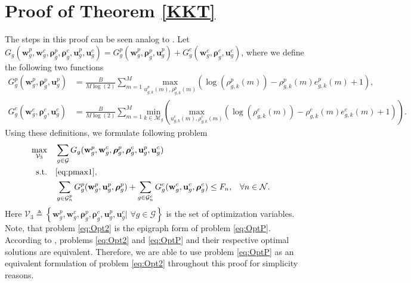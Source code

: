 \documentclass[12pt,draftcls,onecolumn]{IEEEtran}
\theoremstyle{remark}
\theoremstyle{definition}
\begin{document}
{\section{Proof of Theorem \ref{KKT}} \label{app2}
The steps in this proof can be seen analog to \cite[Theorem 2]{6190228}. Let $G_g(\mathbf{w}_{g}^p, \mathbf{w}_{g}^c, {\bm \rho}_g^p,{\bm \rho}_g^c,\mathbf{u}_g^p,\mathbf{u}_g^c) = G_g^p(\mathbf{w}_{g}^p, {\bm \rho}_g^p,\mathbf{u}_g^p) + G_g^c(\mathbf{w}_{g}^c, {\bm \rho}_g^c,\mathbf{u}_g^c)$, where we define the following two functions
\begin{align}
	G_g^p(\mathbf{w}_{g}^p, {\bm \rho}_g^p,\mathbf{u}_g^p) &= \frac{B}{M\log(2)} \sum_{m=1}^{M} \underset{u_{g,k}^p(m),\rho_{g,k}^p(m)}{\text{max}} \left( \log(\rho_{g,k}^p(m))-\rho_{g,k}^p(m) e_{g,k}^p(m) + 1 \right),\\
	G_g^c(\mathbf{w}_{g}^c, {\bm \rho}_g^c,\mathbf{u}_g^c) &= \frac{B}{M\log(2)} \sum_{m=1}^{M} \underset{k\in\mathcal{M}_g}{\text{min}} \left( \underset{u_{g,k}^c(m),\rho_{g,k}^c(m)}{\text{max}} \left( \log(\rho_{g,k}^c(m))-\rho_{g,k}^c(m) e_{g,k}^c(m) + 1 \right) \right).
\end{align}
Using these definitions, we formulate following problem
\begin{subequations}\label{eq:OptP}
	\begin{align}
		\underset{\mathcal{V}_3}{\text{max}}\quad &\sum_{g\in\mathcal{G}} G_g(\mathbf{w}_{g}^p, \mathbf{w}_{g}^c, {\bm \rho}_g^p,{\bm \rho}_g^c,\mathbf{u}_g^p,\mathbf{u}_g^c)  \\
		\text{s.t.} \quad & \eqref{eq:pmax1}, \nonumber \\
		& \sum_{{g \in \mathcal{G}_n^p}}G_g^p(\mathbf{w}_g^p,\mathbf{u}_g^p,{\bm \rho}_g^p)  + \sum_{{g \in \mathcal{G}_n^c}}G_g^c(\mathbf{w}_g^c,\mathbf{u}_g^c,{\bm \rho}_g^c) \leq F_{n}, &&\forall n \in \mathcal{N}.
	\end{align}
\end{subequations}  
Here $\mathcal{V}_3 \triangleq \left\lbrace \mathbf{w}_{g}^p, \mathbf{w}_{g}^c, {\bm \rho}_g^p,{\bm \rho}_g^c,\mathbf{u}_g^p,\mathbf{u}_g^c|\,\, \forall g \in \mathcal{G}\right\rbrace$ is the set of optimization variables. Note, that problem \eqref{eq:Opt2} is the epigraph form of problem \eqref{eq:OptP}. According to \cite[Chapter 4]{convexOpt}, problems \eqref{eq:Opt2} and \eqref{eq:OptP} and their respective optimal solutions are equivalent. Therefore, we are able to use problem \eqref{eq:OptP} as an equivalent formulation of problem \eqref{eq:Opt2} throughout this proof for simplicity reasons. \\
}
\end{document}
